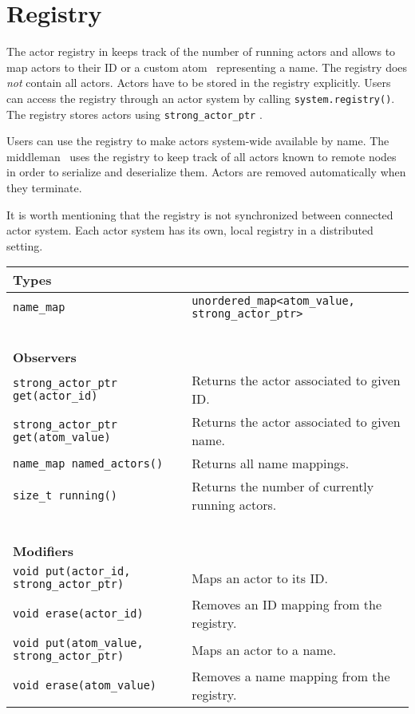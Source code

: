 \section{Registry}
\label{registry}

The actor registry in \lib keeps track of the number of running actors and allows to map actors to their ID or a custom atom~ representing a name. The registry does \emph{not} contain all actors. Actors have to be stored in the registry explicitly. Users can access the registry through an actor system by calling \lstinline^system.registry()^. The registry stores actors using \lstinline^strong_actor_ptr^ .

Users can use the registry to make actors system-wide available by name. The middleman~ uses the registry to keep track of all actors known to remote nodes in order to serialize and deserialize them. Actors are removed automatically when they terminate.

It is worth mentioning that the registry is not synchronized between connected actor system. Each actor system has its own, local registry in a distributed setting.

{\small
\begin{tabular}{ll}
  \textbf{Types} & ~ \\
  \hline
  \lstinline^name_map^ & \lstinline^unordered_map<atom_value, strong_actor_ptr>^ \\
  \hline
  ~ & ~ \\ \textbf{Observers} & ~ \\
  \hline
  \lstinline^strong_actor_ptr get(actor_id)^ & Returns the actor associated to given ID. \\
  \hline
  \lstinline^strong_actor_ptr get(atom_value)^ & Returns the actor associated to given name. \\
  \hline
  \lstinline^name_map named_actors()^ & Returns all name mappings. \\
  \hline
  \lstinline^size_t running()^ & Returns the number of currently running actors. \\
  \hline
  ~ & ~ \\ \textbf{Modifiers} & ~ \\
  \hline
  \lstinline^void put(actor_id, strong_actor_ptr)^ & Maps an actor to its ID. \\
  \hline
  \lstinline^void erase(actor_id)^ & Removes an ID mapping from the registry. \\
  \hline
  \lstinline^void put(atom_value, strong_actor_ptr)^ & Maps an actor to a name. \\
  \hline
  \lstinline^void erase(atom_value)^ & Removes a name mapping from the registry. \\
  \hline
\end{tabular}
}
